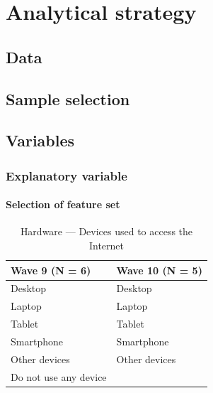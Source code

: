 \chapter{\label{ch:4-strategy}Analytical strategy}

\section{Data}

\section{Sample selection}\label{app:imaging}


\section{Variables}\label{sub:diagnostic}

\subsection{Explanatory variable}


\subsubsection{Selection of feature set}

\begin{table}[h!]
    \centering
    \caption{Hardware --- Devices used to access the Internet}
    \label{tab:hardware}
    \begin{tabular}{ll}
        \toprule
        Wave 9 (N = 6) & Wave 10 (N = 5) \\
        \midrule
        Desktop & Desktop \\
        Laptop & Laptop \\
        Tablet & Tablet \\
        Smartphone & Smartphone \\
        Other devices & Other devices \\
        Do not use any device & \\
        \bottomrule
    \end{tabular}
\end{table}


